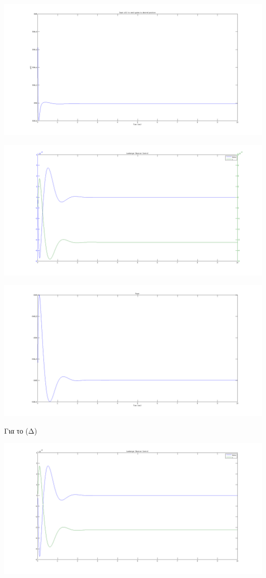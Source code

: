 \documentclass[a4paper,oneside, 12pt]{article}
\begin{document}
\includegraphics[width=\textwidth]{E4.png}

\includegraphics[width=\textwidth]{E5.png}

\includegraphics[width=\textwidth]{power2.png}


Για το (Δ)

\includegraphics[width=\textwidth]{E7.png}
\end{document}

